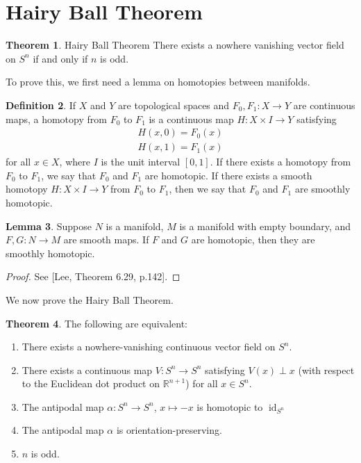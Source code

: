 \documentclass[]{article}
\DeclareMathOperator{\id}{id}
\theoremstyle{definition}
\newtheorem{theorem}{Theorem}[section] %
\theoremstyle{definition}
\newtheorem{definition}[theorem]{Definition} %
\newtheorem{lemma}[theorem]{Lemma}
\begin{document}
\section{Hairy Ball Theorem}

\begin{theorem}{Hairy Ball Theorem}
    There exists a nowhere vanishing vector field on $S^n$ if and only if $n$ is odd.
\end{theorem}

To prove this, we first need a lemma on homotopies between manifolds.

\begin{definition}
    If $X$ and $Y$ are topological spaces and $F_0, F_1 : X \rightarrow  Y$ are continuous maps, a homotopy from $F_0$ to $F_1$ is a continuous map $H:X\times I \rightarrow  Y$ satisfying\begin{align*}
        H(x,0) = F_0(x)\\
        H(x,1) = F_1(x)
    \end{align*}
    for all $x\in X$, where $I$ is the unit interval $ [0,1]$. If there exists a homotopy from $F_0$ to $F_1$, we say that $F_0$ and $F_1$ are
    homotopic. If there exists a smooth homotopy $H:X\times I\rightarrow Y$ from $F_0$ to $F_1$, then we say that $F_0$ and $F_1$ are smoothly homotopic.
\end{definition}

\begin{lemma}
    \label{homotopy}
    Suppose $N$ is a manifold, $M$ is a manifold with empty boundary, and $F,G: N \rightarrow  M$ are smooth maps. If $F$ and $G$ are homotopic, then they are smoothly homotopic.
\end{lemma}

\begin{proof}
    See [Lee, Theorem 6.29, p.142].
\end{proof}

We now prove the Hairy Ball Theorem.

\begin{theorem}
    The following are equivalent:
    \begin{enumerate}
        \item There exists a nowhere-vanishing continuous vector field on $S^n$.
        \item There exists a continuous map $V : S^n \rightarrow S^n$ satisfying $V(x)\perp x$ (with respect to the Euclidean dot product on $\mathbb{R}^{n+1}$) for all $x\in S^n$.
        \item The antipodal map $\alpha:S^n \rightarrow S^n$, $x\mapsto -x$ is homotopic to $\id_{S^n}$
        \item The antipodal map $\alpha$ is orientation-preserving.
        \item $n$ is odd.
    \end{enumerate}
\end{theorem}
\end{document}
